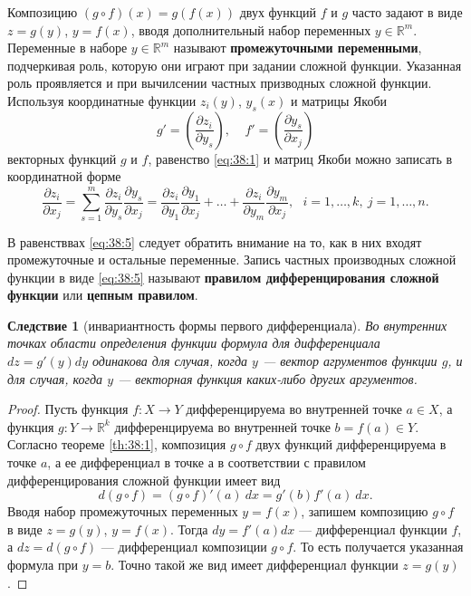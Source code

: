\documentclass[12pt]{report}
\numberwithin{equation}{section}
\newtheorem{remark}{Следствие}[section]
\begin{document}
Композицию $(g \circ f) (x) = g(f(x))$ двух функций $f$ и $g$ часто задают в виде $z = g(y)$, $y = f(x)$, вводя дополнительный набор переменных $y \in \mathbb{R}^m$. Переменные в наборе  $y \in \mathbb{R}^m$ называют \textbf{промежуточными переменными}, подчеркивая роль, которую они играют при задании сложной функции. Указанная роль проявляется и при вычилсении частных призводных сложной функции. Используя координатные функции $z_i (y)$, $y_s(x)$ и матрицы Якоби
\[ g' = \left( \frac{\partial z_i}{\partial y_s} \right),~~~~~ f' = \left( \frac{\partial y_s}{\partial x_j} \right)\]
векторных функций $g$ и $f$, равенство \eqref{eq:38:1} и матриц Якоби можно записать в координатной форме
\begin{equation} \label{eq:38:5}
\frac{\partial z_i}{\partial x_j} = \sum_{s = 1}^m \frac{\partial z_i}{\partial y_s}\frac{\partial y_s}{\partial x_j} = \frac{\partial z_i}{\partial y_1} \frac{\partial y_1}{\partial x_j} + \dots + \frac{\partial z_i}{\partial y_m} \frac{\partial y_m}{\partial x_j},~~~i = 1, \ldots, k,~j = 1, \ldots, n.
\end{equation}

В равенстввах \eqref{eq:38:5} следует обратить внимание на то, как в них входят промежуточные и остальные переменные. Запись частных производных сложной функции в виде \eqref{eq:38:5} называют \textbf{правилом дифференцирования сложной функции} или \textbf{цепным правилом}.

\begin{remark}[инвариантность формы первого дифференциала] \label{rem:38:1}
Во внутренних точках области определения функции формула для дифференциала $dz = g'(y)dy$ одинакова для случая, когда $y$ --- вектор агрументов функции $g$, и для случая, когда $y$ --- векторная функция каких-либо других аргументов.
\end{remark}
\begin{proof}
Пусть функция $f : X \to Y$ дифференцируема во внутренней точке $a \in X$, а функция $g : Y \to \mathbb{R}^k$ дифференцируема во внутренней точке $b = f(a) \in Y$. Согласно теореме \ref{th:38:1}, композиция $g \circ f$ двух функций дифференцируема в точке $a$, а ее дифференциал в точке $а$ в соответствии с правилом дифференцирования сложной функции имеет вид
\[ d(g \circ f) = (g \circ f)'(a)~dx = g'(b) f'(a) ~dx.\]
Вводя набор промежуточных переменных $y = f(x)$, запишем композицию $g \circ f$ в виде $z = g(y)$, $y = f(x)$. Тогда $dy = f'(a)dx$ --- дифференциал функции $f$, а $dz  =d(g \circ f)$ --- дифференциал композиции $g \circ f$. То есть получается указанная формула при $ y = b$. Точно такой же вид имеет дифференциал функции $z = g(y)$.
\end{proof}
\end{document}

